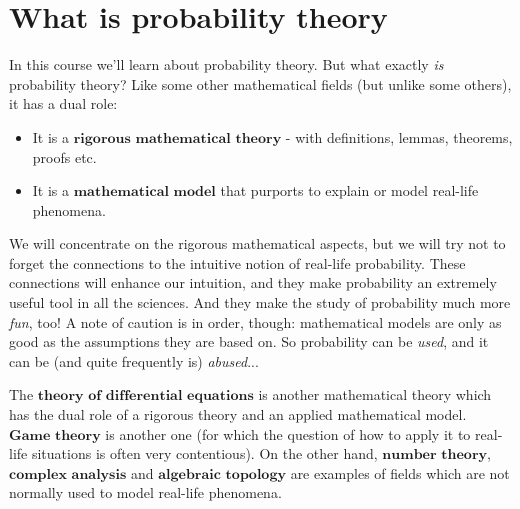 \section{What is probability theory}

In this course we'll learn about probability theory.
But what exactly \emph{is} probability theory? Like some
other mathematical fields (but unlike some others), it
has a dual role:

\begin{itemize}
\item It is a $\textbf{rigorous mathematical theory}$ -
with definitions, lemmas, theorems, proofs etc.

\item It is a $\textbf{mathematical model}$ that purports
to explain or model real-life phenomena.
\end{itemize}

\noindent We will concentrate on the rigorous mathematical
aspects, but we will try not to forget the connections
to the intuitive notion of real-life probability.
These connections will enhance our intuition, and they
make probability an extremely useful tool in all the
sciences. And they make the study of probability much
more \emph{fun}, too! A note of caution is in order,
though: mathematical models are only as good as the
assumptions they are based on. So probability can be
\emph{used}, and it can be (and quite frequently is)
\emph{abused}...

\begin{example}
The $\textbf{theory of differential equations}$ is
another mathematical theory which has the dual role of
a rigorous theory and an applied mathematical model.
$\textbf{Game theory}$ is another one (for which the
question of how to apply it to real-life situations is
often very contentious). On the other hand,
$\textbf{number theory}$, $\textbf{complex analysis}$
and $\textbf{algebraic topology}$ are examples of
fields which are not normally used to model real-life
phenomena.
\end{example}
